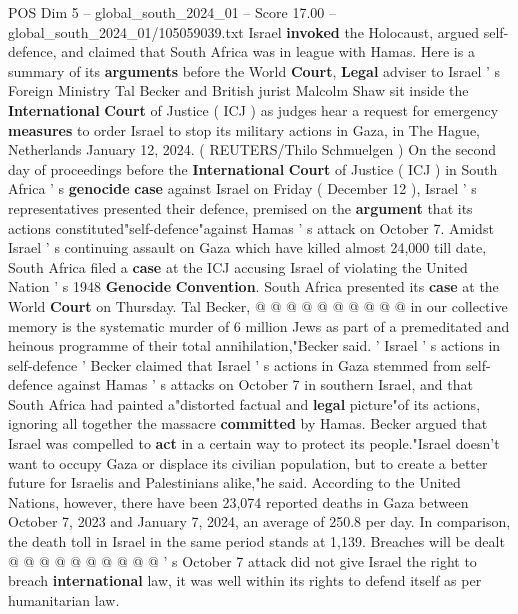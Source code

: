 \begin{textsample}{POS Dim 5 – global\_south\_2024\_01 – Score 17.00 – global\_south\_2024\_01/105059039.txt}  \label{ex:f5_pos_020}
Israel \textbf{invoked} the Holocaust, argued self-defence, and claimed that South Africa was in league with Hamas.
Here is a summary of its \textbf{arguments} before the World \textbf{Court}, \textbf{Legal} adviser to Israel ' s Foreign Ministry Tal Becker and British jurist Malcolm Shaw sit inside the \textbf{International} \textbf{Court} of Justice ( ICJ ) as judges hear a request for emergency \textbf{measures} to order Israel to stop its military actions in Gaza, in The Hague, Netherlands January 12, 2024. ( REUTERS/Thilo Schmuelgen ) On the second day of proceedings before the \textbf{International} \textbf{Court} of Justice ( ICJ ) in South Africa ' s \textbf{genocide} \textbf{case} against Israel on Friday ( December 12 ), Israel ' s representatives presented their defence, premised on the \textbf{argument} that its actions constituted"self-defence"against Hamas ' s attack on October 7.
Amidst Israel ' s continuing assault on Gaza which have killed almost 24,000 till date, South Africa filed a \textbf{case} at the ICJ accusing Israel of violating the United Nation ' s 1948 \textbf{Genocide} \textbf{Convention}.
South Africa presented its \textbf{case} at the World \textbf{Court} on Thursday.
Tal Becker, @ @ @ @ @ @ @ @ @ @ in our collective memory is the systematic murder of 6 million Jews as part of a premeditated and heinous programme of their total annihilation,"Becker said. ' Israel ' s actions in self-defence ' Becker claimed that Israel ' s actions in Gaza stemmed from self-defence against Hamas ' s attacks on October 7 in southern Israel, and that South Africa had painted a"distorted factual and \textbf{legal} picture"of its actions, ignoring all together the massacre \textbf{committed} by Hamas.
Becker argued that Israel was compelled to \textbf{act} in a certain way to protect its people."Israel doesn't want to occupy Gaza or displace its civilian population, but to create a better future for Israelis and Palestinians alike,"he said.
According to the United Nations, however, there have been 23,074 reported deaths in Gaza between October 7, 2023 and January 7, 2024, an average of 250.8 per day.
In comparison, the death toll in Israel in the same period stands at 1,139.
Breaches will be dealt @ @ @ @ @ @ @ @ @ @ ' s October 7 attack did not give Israel the right to breach \textbf{international} law, it was well within its rights to defend itself as per humanitarian law.

\end{textsample}
